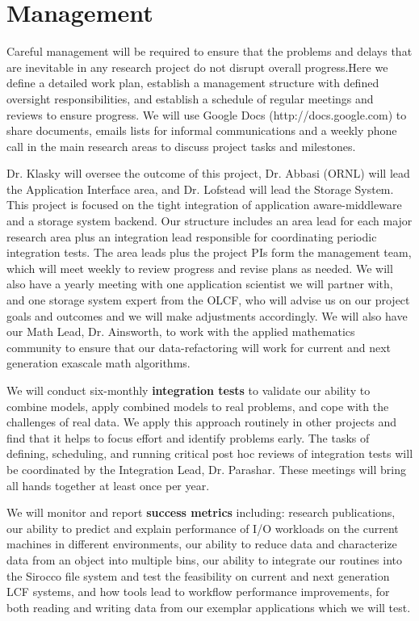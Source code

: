 \section{Management}
\label{sec:management}

Careful management will be required to ensure that the problems and delays that are inevitable in any research project
do not  disrupt overall progress.Here we define a detailed work plan,
establish a  management structure with defined oversight responsibilities, and establish a schedule of regular meetings and
reviews to ensure progress.  We will use Google Docs (http://docs.google.com) to share documents, emails lists for informal communications and a 
weekly phone call in the main research areas to discuss project tasks and milestones. 

Dr. Klasky will oversee the outcome of this project,  Dr. Abbasi (ORNL) will lead the Application Interface area, and Dr. Lofstead
will lead the Storage System. This project is focused on the tight integration of application aware-middleware and a storage system backend.
Our structure includes an area lead for each major research area plus
an integration lead responsible for coordinating periodic integration tests. The area leads plus the project PIs
form the management team, which will meet weekly to review progress and revise plans as needed.
We will also have a  yearly meeting with  one application scientist we will partner with,  and one storage system expert from the 
OLCF, who will advise us on our project goals and outcomes and we will make adjustments accordingly. We will also have our
Math Lead, Dr. Ainsworth, to work with the applied mathematics community to ensure that our data-refactoring will work 
for current and next generation exascale math algorithms. 

We will conduct six-monthly {\bf integration tests}  to validate our ability to combine models, apply
combined models to real problems, and cope with the challenges of real data. We apply this approach routinely
in other projects and find that it helps to focus effort and identify problems early. The tasks of defining,
scheduling, and running critical post hoc reviews of integration tests will be coordinated by the Integration Lead, Dr. Parashar. 
These meetings will bring all hands together at least once per year.

We will monitor and report {\bf success metrics} including: 
research publications, 
our ability to predict and explain performance of I/O workloads on the current machines in different environments, 
our ability to reduce data and characterize data from an object into multiple bins, 
our ability to integrate our routines into the Sirocco file system and test the feasibility on current and next generation LCF systems, and
how tools lead to workflow performance improvements, for both reading and writing data from our exemplar applications which we will test.

